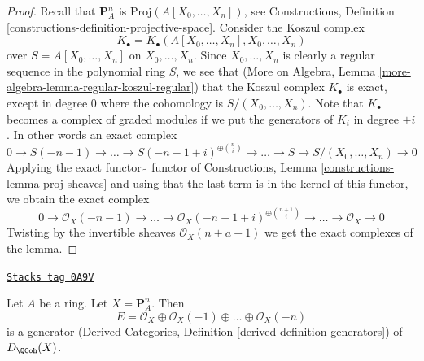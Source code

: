 \begin{proof}
Recall that $\mathbf{P}^n_A$ is $\text{Proj}(A[X_0, \ldots, X_n])$, see
Constructions, Definition \ref{constructions-definition-projective-space}.
Consider the Koszul complex
$$
K_\bullet = K_\bullet(A[X_0, \ldots, X_n], X_0, \ldots, X_n)
$$
over $S = A[X_0, \ldots, X_n]$ on $X_0, \ldots, X_n$.
Since $X_0, \ldots, X_n$ is clearly a regular sequence in the
polynomial ring $S$, we see that
(More on Algebra, Lemma \ref{more-algebra-lemma-regular-koszul-regular})
that the Koszul complex $K_\bullet$ is exact, except in degree $0$
where the cohomology is $S/(X_0, \ldots, X_n)$.
Note that $K_\bullet$ becomes a complex of graded modules if we
put the generators of $K_i$ in degree $+i$. In other words an
exact complex
$$
0 \to S(-n - 1) \to \ldots \to S(-n - 1 + i)^{\oplus {n \choose i}} \to \ldots
\to S \to S/(X_0, \ldots, X_n) \to 0
$$
Applying the exact functor $\tilde{\ }$ functor of Constructions,
Lemma \ref{constructions-lemma-proj-sheaves} and using that
the last term is in the kernel of this functor,
we obtain the exact complex
$$
0 \to \mathcal{O}_X(-n - 1) \to \ldots
\to \mathcal{O}_X(-n - 1 + i)^{\oplus {n + 1 \choose i}} \to
\ldots \to \mathcal{O}_X \to 0
$$
Twisting by the invertible sheaves $\mathcal{O}_X(n + a + 1)$
we get the exact complexes of the lemma.
\end{proof}

\begin{lemma}[Generator P1]
\label{perfect-lemma-generator-P1}
\href{https://stacks.math.columbia.edu/tag/0A9V}{\texttt{Stacks tag 0A9V}}

Let $A$ be a ring. Let $X = \mathbf{P}^n_A$. Then
$$
E =
\mathcal{O}_X \oplus \mathcal{O}_X(-1) \oplus \ldots \oplus \mathcal{O}_X(-n)
$$
is a generator
(Derived Categories, Definition \ref{derived-definition-generators})
of $D_\QCoh(X)$.
\end{lemma}

